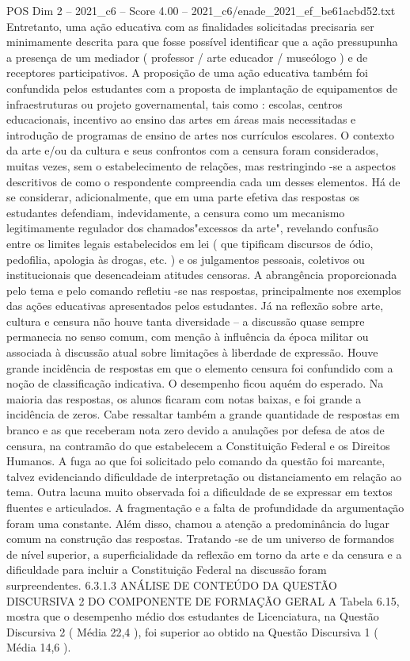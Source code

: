 \begin{textsample}{POS Dim 2 – 2021\_c6 – Score 4.00 – 2021\_c6/enade\_2021\_ef\_be61acbd52.txt}
Entretanto, uma ação educativa com as finalidades solicitadas precisaria ser minimamente descrita para que fosse possível identificar que a ação pressupunha a presença de um mediador ( professor / arte educador / museólogo ) e de receptores participativos.
A proposição de uma ação educativa também foi confundida pelos estudantes com a proposta de implantação de equipamentos de infraestruturas ou projeto governamental, tais como : escolas, centros educacionais, incentivo ao ensino das artes em áreas mais necessitadas e introdução de programas de ensino de artes nos currículos escolares.
O contexto da arte e/ou da cultura e seus confrontos com a censura foram considerados, muitas vezes, sem o estabelecimento de relações, mas restringindo -se a aspectos descritivos de como o respondente compreendia cada um desses elementos.
Há de se considerar, adicionalmente, que em uma parte efetiva das respostas os estudantes defendiam, indevidamente, a censura como um mecanismo legitimamente regulador dos chamados"excessos da arte", revelando confusão entre os limites legais estabelecidos em lei ( que tipificam discursos de ódio, pedofilia, apologia às drogas, etc. ) e os julgamentos pessoais, coletivos ou institucionais que desencadeiam atitudes censoras.
A abrangência proporcionada pelo tema e pelo comando refletiu -se nas respostas, principalmente nos exemplos das ações educativas apresentados pelos estudantes.
Já na reflexão sobre arte, cultura e censura não houve tanta diversidade – a discussão quase sempre permanecia no senso comum, com menção à influência da época militar ou associada à discussão atual sobre limitações à liberdade de expressão.
Houve grande incidência de respostas em que o elemento censura foi confundido com a noção de classificação indicativa.
O desempenho ficou aquém do esperado.
Na maioria das respostas, os alunos ficaram com notas baixas, e foi grande a incidência de zeros.
Cabe ressaltar também a grande quantidade de respostas em branco e as que receberam nota zero devido a anulações por defesa de atos de censura, na contramão do que estabelecem a Constituição Federal e os Direitos Humanos.
A fuga ao que foi solicitado pelo comando da questão foi marcante, talvez evidenciando dificuldade de interpretação ou distanciamento em relação ao tema.
Outra lacuna muito observada foi a dificuldade de se expressar em textos fluentes e articulados.
A fragmentação e a falta de profundidade da argumentação foram uma constante.
Além disso, chamou a atenção a predominância do lugar comum na construção das respostas.
Tratando -se de um universo de formandos de nível superior, a superficialidade da reflexão em torno da arte e da censura e a dificuldade para incluir a Constituição Federal na discussão foram surpreendentes. 6.3.1.3 ANÁLISE DE CONTEÚDO DA QUESTÃO DISCURSIVA 2 DO COMPONENTE DE FORMAÇÃO GERAL A Tabela 6.15, mostra que o desempenho médio dos estudantes de Licenciatura, na Questão Discursiva 2 ( Média 22,4 ), foi superior ao obtido na Questão Discursiva 1 ( Média 14,6 ).

\end{textsample}
